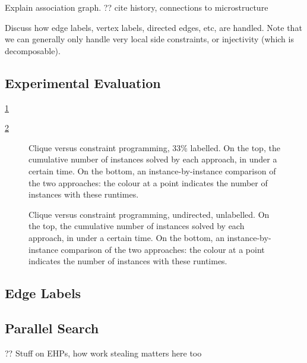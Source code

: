 \documentclass{llncs}
\begin{document}
Explain association graph. ?? cite history, connections to microstructure

Discuss how edge labels, vertex labels, directed edges, etc, are handled. Note that we can generally
only handle very local side constraints, or injectivity (which is decomposable).

\subsection{Experimental Evaluation}

\cref{figure:unconnected-33}

\cref{figure:unconnected-plain}

\begin{figure}[p]
    \centering
    
    \caption{Clique versus constraint programming, 33\% labelled. On the top, the cumulative
    number of instances solved by each approach, in under a certain time. On the bottom, an
    instance-by-instance comparison of the two approaches: the colour at a point indicates the
    number of instances with these runtimes.} \label{figure:unconnected-33}
\end{figure}

\begin{figure}[p]
    \centering
    
    \caption{Clique versus constraint programming, undirected, unlabelled. On the top, the cumulative
    number of instances solved by each approach, in under a certain time. On the bottom, an
        instance-by-instance comparison of the two approaches: the colour at a point indicates the
    number of instances with these runtimes.} \label{figure:unconnected-plain}
\end{figure}

\subsection{Edge Labels}

\subsection{Parallel Search}

\cite{DBLP:journals/jcc/KoncDTRJ12,DBLP:journals/algorithms/McCreeshP13,DBLP:journals/topc/McCreeshP15,DBLP:journals/cor/SegundoLP16}

?? Stuff on EHPs, how work stealing matters here too \cite{DBLP:journals/jco/BatsynGMP14}
\end{document}
